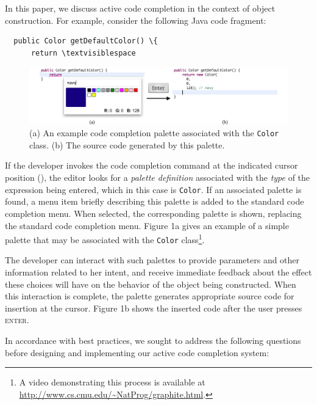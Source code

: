 In this paper, we discuss active code completion in the context of object construction. For example, consider the following Java code fragment:

\begin{lstlisting}
  public Color getDefaultColor() \{
      return \textvisiblespace
\end{lstlisting}

\begin{figure}\label{color}
\begin{center}
\includegraphics[width=40pc]{color_palette.png}\end{center}
\caption{(a) An example code completion palette associated with the \texttt{Color} class. (b) The source code generated by this palette.}
\end{figure}

If the developer invokes the code completion command at the indicated cursor position (\textvisiblespace), the editor  looks  for a {\it palette definition} associated with the {\it type} of the expression being entered, which in this case is  \verb|Color|. If an associated palette is found, a menu item briefly describing this palette is added to the standard code completion menu. When selected, the corresponding palette is shown, replacing the standard code completion menu. Figure 1a gives an example of a simple palette that may be associated with the \verb|Color| class\footnote{A video demonstrating this process is available at \\\url{http://www.cs.cmu.edu/~NatProg/graphite.html}.}. 

The developer can interact with such palettes to provide parameters and other information related to her intent, and receive immediate feedback about the effect these choices will have on the behavior of the object being constructed. When this interaction is complete, the palette generates appropriate source code for insertion at the cursor. Figure 1b shows the inserted code after the user presses \textsc{enter}.

In accordance with best practices, we sought to address the following questions before designing and implementing our active code completion system:

